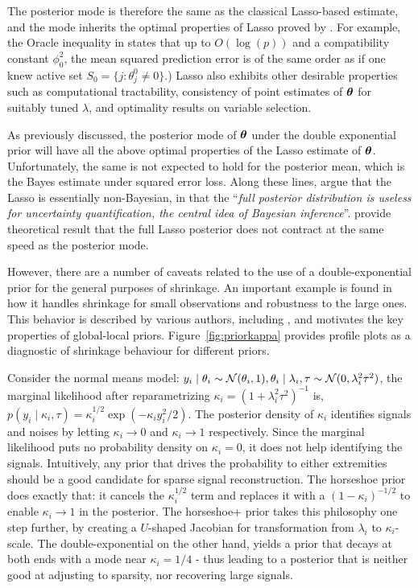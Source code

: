 \documentclass[11pt]{article}
\begin{document}
The posterior mode is therefore	the	 same as the classical Lasso-based
estimate, and the mode inherits the optimal properties of Lasso proved by
\cite{buhlmann2011statistics}. For example, the Oracle inequality in \citet[Eq.
(2.8), Th. (6.1)]{buhlmann2011statistics} states that up to $O(\log(p))$ and a
compatibility constant $\phi_0^2$, the mean squared prediction error is of the
same order as if one knew active set $S_0 = \{j : \theta_j^0 \neq 0 \}$.)
Lasso also exhibits other desirable properties such as computational
tractability, consistency of point estimates of $\boldsymbol{\theta}$ for suitably tuned
$\lambda$, and optimality results on variable selection. 

As previously discussed, the posterior mode of $\boldsymbol{\theta}$ under the double
exponential prior will have all the above optimal properties of the Lasso
estimate of $\boldsymbol{\theta}$. Unfortunately, the same is not expected to hold for the
posterior mean, which is the Bayes estimate under squared error loss. Along
these lines, \citet{castillo2015bayesian} argue that the Lasso is essentially
non-Bayesian, in that the ``\textsl{full posterior distribution is useless for
uncertainty quantification, the central idea of Bayesian inference}''.
\citet{castillo2015bayesian} provide theoretical result that the full Lasso
posterior does not contract at the same speed as the posterior mode. 

However, there are a number of caveats related to the use of a
double-exponential prior for the general purposes of shrinkage.  An important
example is found in how it handles shrinkage for small observations and
robustness to the large ones.  This behavior is described by various authors,
including \cite{polson2010shrink,datta2013asymptotic}, and motivates the key
properties of global-local priors. Figure~\ref{fig:priorkappa} provides
profile plots as a diagnostic of shrinkage behaviour for different
priors.

Consider the normal means model: $y_i \mid \theta_i \sim {\cal N}(\theta_i,1), \theta_i \mid \lambda_i, \tau \sim {\cal N}(0, \lambda_i^2 \tau^2)$, the marginal likelihood after reparametrizing $\kappa_i = (1+\lambda_i^2\tau^2)^{-1}$ is,  $p(y_i \mid \kappa_i, \tau) = \kappa_i^{1/2} \exp \left(-\kappa_i y_i^2/2 \right)$. The
posterior density of $\kappa_i$ identifies signals and noises by letting $\kappa_i \to 0$ and $\kappa_i \to 1$ respectively. Since the marginal
likelihood puts no probability density on $\kappa_i = 0$, it does not help identifying the signals. Intuitively, any prior that drives the probability to
either extremities should be a good candidate for sparse signal reconstruction. The horseshoe prior does exactly that: it cancels the $\kappa_i^{1/2}$ 
term and replaces it with a $(1-\kappa_i)^{-1/2}$ to enable $\kappa_i \to 1$ in the posterior. The horseshoe+ prior takes this philosophy one step further, 
by creating a $U$-shaped Jacobian for transformation from $\lambda_i$ to $\kappa_i$-scale. The double-exponential on the other hand, yields a prior that
decays at both ends with a mode near $\kappa_i = 1/4$ - thus leading to a posterior that is neither good at adjusting to sparsity, nor recovering large
signals. 
\end{document}
